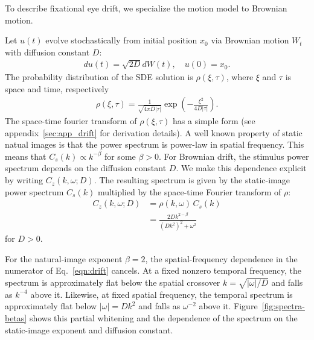 \documentclass[12pt]{article}
\newcommand{\afbcomment}[1]{\textcolor{alexcolor}{#1}}
\begin{document}


To describe fixational eye drift, we specialize the motion model to Brownian motion.

Let $u(t)$ evolve stochastically from initial position $x_0$ via Brownian motion $W_t$ with diffusion constant $D$:
\begin{align}
    du(t) = \sqrt{2D} dW(t),\quad u(0) = x_0.
\end{align}
The probability distribution of the SDE solution is $\rho(\xi,\tau)$, where $\xi$ and $\tau$ is space and time, respectively
\begin{align}
    \rho(\xi,\tau) = \frac{1}{\sqrt{4\pi D|\tau|}} \exp\!   \left( -\frac{\xi^2}{4D|\tau|} \right).
\end{align}
The space-time fourier transform of $\rho(\xi,\tau)$ has a simple form (see appendix~\ref{sec:app_drift} for derivation details). 
A well known property of static natual images is that the power spectrum is power-law in spatial frequency. This means that $C_s(k) \propto k^{-\beta}$ for some $\beta>0$. 
For Brownian drift, the stimulus power spectrum depends on the diffusion constant $D$. We make this dependence explicit by writing $C_z(k,\omega;D)$. The resulting spectrum is given by the static-image power spectrum $C_s(k)$ multiplied by the space-time Fourier transform of $\rho$:
\begin{align}
    C_z(k,\omega;D) & = \rho(k,\omega)\, C_s(k) \\
    & = \frac{2Dk^{2-\beta}}{(Dk^2)^2+\omega^2} \label{eqn:drift}
\end{align}
for $D>0$. 

 

For the natural-image exponent $\beta=2$, the spatial-frequency dependence in the numerator of Eq.~\ref{eqn:drift} cancels. At a fixed nonzero temporal frequency, the spectrum is approximately flat below the spatial crossover $k=\sqrt{|\omega|/D}$ and falls as $k^{-4}$ above it. Likewise, at fixed spatial frequency, the temporal spectrum is approximately flat below $|\omega|=Dk^2$ and falls as $\omega^{-2}$ above it. Figure~\ref{fig:spectra-betas} shows this partial whitening and the dependence of the spectrum on the static-image exponent and diffusion constant.
\end{document}
